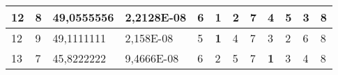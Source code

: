 \documentclass[conference]{IEEEtran}
\begin{document}
\begin{table*}[]
\begin{tabular}{|llll|llllllll|}
\multicolumn{1}{|l|}{12}                                                    & \multicolumn{1}{l|}{8}                                                        & \multicolumn{1}{l|}{49,0555556}                                                   & 2,2128E-08                     & \multicolumn{1}{l|}{6}                                                  & \multicolumn{1}{l|}{\textbf{1}}                                         & \multicolumn{1}{l|}{2}                                                  & \multicolumn{1}{l|}{7}                                                  & \multicolumn{1}{l|}{4}                                                  & \multicolumn{1}{l|}{5}                                                  & \multicolumn{1}{l|}{3}                                                  & 8                          \\ \hline
\multicolumn{1}{|l|}{12}                                                    & \multicolumn{1}{l|}{9}                                                        & \multicolumn{1}{l|}{49,1111111}                                                   & 2,158E-08                      & \multicolumn{1}{l|}{5}                                                  & \multicolumn{1}{l|}{\textbf{1}}                                         & \multicolumn{1}{l|}{4}                                                  & \multicolumn{1}{l|}{7}                                                  & \multicolumn{1}{l|}{3}                                                  & \multicolumn{1}{l|}{2}                                                  & \multicolumn{1}{l|}{6}                                                  & 8                          \\ \hline
\multicolumn{1}{|l|}{13}                                                    & \multicolumn{1}{l|}{7}                                                        & \multicolumn{1}{l|}{45,8222222}                                                   & 9,4666E-08                     & \multicolumn{1}{l|}{6}                                                  & \multicolumn{1}{l|}{2}                                                  & \multicolumn{1}{l|}{5}                                                  & \multicolumn{1}{l|}{7}                                                  & \multicolumn{1}{l|}{\textbf{1}}                                         & \multicolumn{1}{l|}{3}                                                  & \multicolumn{1}{l|}{4}                                                  & 8                          \\ \hline

\end{tabular}
\end{table*}
\end{document}
